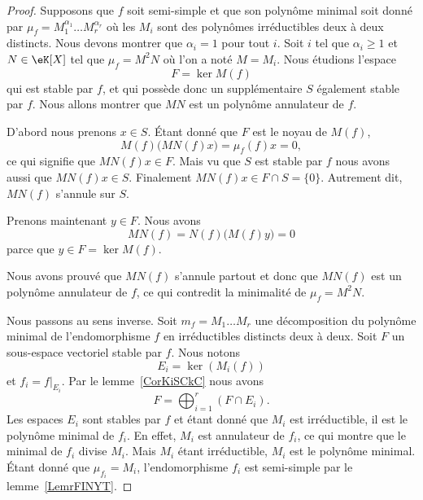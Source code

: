 \begin{proof}

    Supposons que \( f\) soit semi-simple et que son polynôme minimal soit donné par \( \mu_f=M_1^{\alpha_1}\ldots M_r^{\alpha_r}\) où les \( M_i\) sont des polynômes irréductibles deux à deux distincts. Nous devons montrer que \( \alpha_i=1\) pour tout \( i\). Soit \( i\) tel que \( \alpha_i\geq 1\) et \( N\in \eK[X]\) tel que \( \mu_f=M^2N\) où l'on a noté \( M=M_i\). Nous étudions l'espace
    \begin{equation}
        F=\ker M(f)
    \end{equation}
    qui est stable par \( f\), et qui possède donc un supplémentaire \( S\) également stable par \( f\). Nous allons montrer que \( MN\) est un polynôme annulateur de \( f\).

    D'abord nous prenons \( x\in S\). Étant donné que \( F\) est le noyau de \( M(f)\),
    \begin{equation}
        M(f)\big( MN(f)x \big)=\mu_f(f)x=0,
    \end{equation}
    ce qui signifie que \( MN(f)x\in F\). Mais vu que \( S\) est stable par \( f\) nous avons aussi que \( MN(f)x\in S\). Finalement \( MN(f)x\in F\cap S=\{ 0 \}\). Autrement dit, \( MN(f)\) s'annule sur \( S\).

    Prenons maintenant \( y\in F\). Nous avons
    \begin{equation}
        MN(f)=N(f)\big( M(f)y \big)=0
    \end{equation}
    parce que \( y\in F=\ker M(f)\).

    Nous avons prouvé que \( MN(f)\) s'annule partout et donc que \( MN(f)\) est un polynôme annulateur de \( f\), ce qui contredit la minimalité de \( \mu_f=M^2N\).

    Nous passons au sens inverse. Soit \( m_f=M_1\ldots M_r\) une décomposition du polynôme minimal de l'endomorphisme \( f\) en irréductibles distincts deux à deux. Soit \( F\) un sous-espace vectoriel stable par \( f\). Nous notons
    \begin{equation}
        E_i=\ker(M_i(f))
    \end{equation}
    et \( f_i=f|_{E_i}\). Par le lemme~\ref{CorKiSCkC} nous avons
    \begin{equation}
        F=\bigoplus_{i=1}^r(F\cap E_i).
    \end{equation}
    Les espaces \( E_i\) sont stables par \( f\) et étant donné que \( M_i\) est irréductible, il est le polynôme minimal de \( f_i\). En effet, \( M_i\) est annulateur de \( f_i\), ce qui montre que le minimal de \( f_i\) divise \( M_i\). Mais \( M_i\) étant irréductible, \( M_i\) est le polynôme minimal. Étant donné que \( \mu_{f_i}=M_i\), l'endomorphisme \( f_i\) est semi-simple par le lemme~\ref{LemrFINYT}.


\end{proof}

